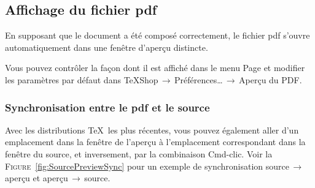 \documentclass[11pt,french]{article}
\newcommand{\acr}[1]{\textsf{#1}}
\newcommand{\cmd}[1]{\textsf{#1}}
\newcommand{\mnu}[1]{\textsf{#1}}
\newcommand{\To}{\,\(\to\)\,}
\begin{document}
\subsection{Affichage du fichier \acr{pdf}}

En supposant que le document a été composé correctement, le fichier \acr{pdf} s'ouvre automatiquement dans une fenêtre d'aperçu distincte.

Vous pouvez contrôler la façon dont il est affiché dans le menu \mnu{Page} et modifier les paramètres par défaut dans \mnu{TeXShop}\To\mnu{Préférences…}\To\mnu{Aperçu du PDF}.

%

\subsubsection{Synchronisation entre le \acr{pdf} et le source}

Avec les distributions \TeX\ les plus récentes, vous pouvez également aller d'un emplacement dans la fenêtre de l'aperçu à l'emplacement correspondant dans la fenêtre du source, et inversement, par la combinaison \cmd{Cmd-clic}. Voir la \textsc{Figure}~\ref{fig:SourcePreviewSync} pour un exemple de synchronisation source\To aperçu et aperçu\To source.


\end{document}

